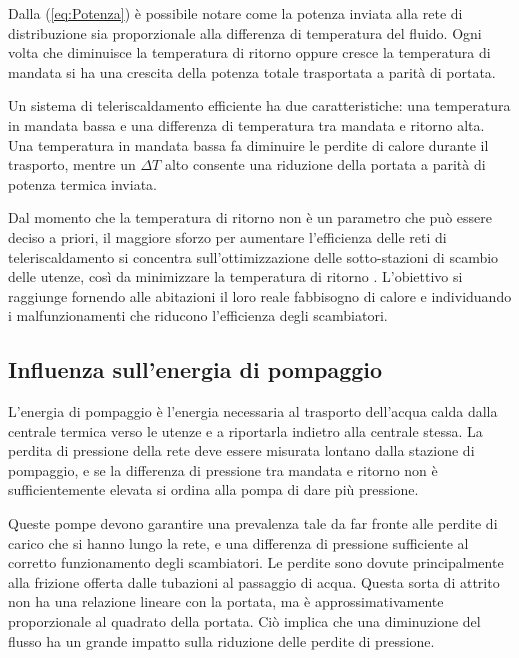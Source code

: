 \documentclass[laurea,oneside,11pt]{USiena_tesiLM3}
\begin{document}
Dalla (\ref{eq:Potenza}) è possibile notare come la potenza inviata alla rete di distribuzione sia proporzionale alla differenza di temperatura del fluido. Ogni volta che diminuisce la temperatura di ritorno oppure cresce la temperatura di mandata si ha una crescita della potenza totale trasportata a parità di portata.

Un sistema di teleriscaldamento efficiente ha due caratteristiche: una temperatura in mandata bassa e una differenza di temperatura tra mandata e ritorno alta. Una temperatura in mandata bassa fa diminuire le perdite di calore durante il trasporto, mentre un $\Delta T$ alto consente una riduzione della portata a parità di potenza termica inviata.

Dal momento che la temperatura di ritorno non è un parametro che può essere deciso a priori, il maggiore sforzo per aumentare l'efficienza delle reti di teleriscaldamento si concentra sull'ottimizzazione delle sotto-stazioni di scambio delle utenze, così da minimizzare la temperatura di ritorno \cite{snoek2002optimization}. L'obiettivo si raggiunge fornendo alle abitazioni il loro reale fabbisogno di calore e individuando i malfunzionamenti che riducono l'efficienza degli scambiatori. 
\subsection{Influenza sull'energia di pompaggio}
L'energia di pompaggio è l'energia necessaria al trasporto dell'acqua calda dalla centrale termica verso le utenze e a riportarla indietro alla centrale stessa. La perdita di pressione della rete deve essere misurata lontano dalla stazione di pompaggio, e se la differenza di pressione tra mandata e ritorno non è sufficientemente elevata si ordina alla pompa di dare più pressione.

Queste pompe devono garantire una prevalenza tale da far fronte alle perdite di carico che si hanno lungo la rete, e una differenza di pressione sufficiente al corretto funzionamento degli scambiatori. Le perdite sono dovute principalmente alla frizione offerta dalle tubazioni al passaggio di acqua. Questa sorta di attrito non ha una relazione lineare con la portata, ma è approssimativamente proporzionale al quadrato della portata. Ciò implica che una diminuzione del flusso ha un grande impatto sulla riduzione delle perdite di pressione.
\end{document}
